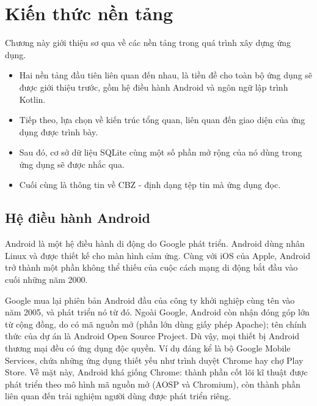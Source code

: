 \documentclass[../../thesis]{subfiles}
\begin{document}
\chapter{Kiến thức nền tảng}\label{chap:fundamental}

Chương này giới thiệu sơ qua về các nền tảng trong quá trình xây dựng ứng dụng.

\begin{itemize}
    \item
        Hai nền tảng đầu tiên liên quan đến nhau, là tiền đề cho toàn bộ ứng
        dụng sẽ được giới thiệu trước, gồm hệ điều hành Android và ngôn ngữ lập
        trình Kotlin.
    \item
        Tiếp theo, lựa chọn về kiến trúc tổng quan, liên quan đến giao diện của
        ứng dụng được trình bày.
    \item
        Sau đó, cơ sở dữ liệu SQLite cùng một số phần mở rộng của nó dùng trong
        ứng dụng sẽ được nhắc qua.
    \item
        Cuối cùng là thông tin về CBZ - định dạng tệp tin mà ứng dụng đọc.
\end{itemize}



\section{Hệ điều hành Android}\label{sec:android}

Android là một hệ điều hành di động do Google phát triển. Android dùng nhân
Linux và được thiết kế cho màn hình cảm ứng. Cùng với iOS của Apple, Android trở
thành một phần không thể thiếu của cuộc cách mạng di động bắt đầu vào cuối những
năm 2000.

Google mua lại phiên bản Android đầu của công ty khởi nghiệp cùng tên vào năm
2005, và phát triển nó từ đó. Ngoài Google, Android còn nhận đóng góp lớn từ
cộng đồng, do có mã nguồn mở (phần lớn dùng giấy phép Apache); tên chính thức
của dự án là Android Open Source Project. Dù vậy, mọi thiết bị Android thương
mại đều có ứng dụng độc quyền. Ví dụ đáng kể là bộ Google Mobile Services, chứa
những ứng dụng thiết yếu như trình duyệt Chrome hay chợ Play Store. Về mặt này,
Android khá giống Chrome: thành phần cốt lõi kĩ thuật được phát triển theo mô
hình mã nguồn mở (AOSP và Chromium), còn thành phần liên quan đến trải nghiệm
người dùng được phát triển riêng.
\end{document}
